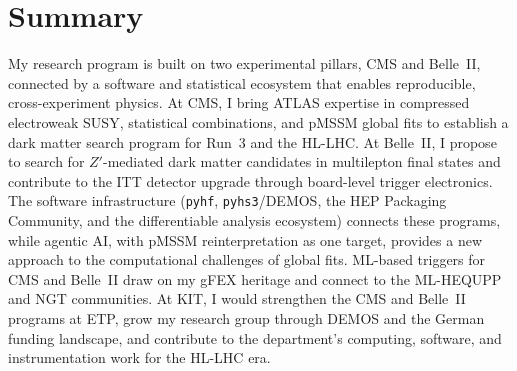 \documentclass[10pt,a4paper,sans]{moderncv} %
\begin{document}
\section{Summary}
My research program is built on two experimental pillars, CMS and Belle~II, connected by a software and statistical ecosystem that enables reproducible, cross-experiment physics. At CMS, I bring ATLAS expertise in compressed electroweak SUSY, statistical combinations, and pMSSM global fits to establish a dark matter search program for Run~3 and the HL-LHC. At Belle~II, I propose to search for $Z'$-mediated dark matter candidates in multilepton final states and contribute to the ITT detector upgrade through board-level trigger electronics. The software infrastructure (\texttt{pyhf}, \texttt{pyhs3}/DEMOS, the HEP Packaging Community, and the differentiable analysis ecosystem) connects these programs, while agentic AI, with pMSSM reinterpretation as one target, provides a new approach to the computational challenges of global fits. ML-based triggers for CMS and Belle~II draw on my gFEX heritage and connect to the ML-HEQUPP and NGT communities. At KIT, I would strengthen the CMS and Belle~II programs at ETP, grow my research group through DEMOS and the German funding landscape, and contribute to the department's computing, software, and instrumentation work for the HL-LHC era.

\printbibliography
\end{document}
